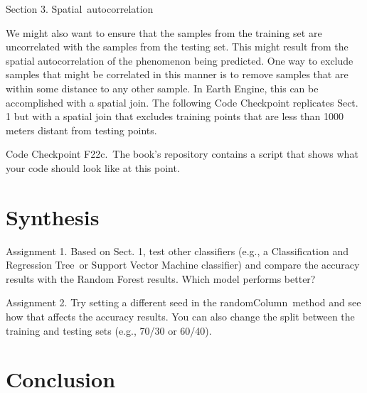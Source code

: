 \documentclass[
  letterpaper,
  DIV=11,
  numbers=noendperiod]{scrreprt}
\begin{document}
Section 3. Spatial~autocorrelation

We might also want to ensure that the samples from the training set are
uncorrelated with the samples from the testing set. This might result
from the spatial autocorrelation of the phenomenon being predicted. One
way to exclude samples that might be correlated in this manner is to
remove samples that are within some distance to any other sample. In
Earth Engine, this can be accomplished with a spatial join. The
following Code Checkpoint replicates Sect. 1 but with a spatial join
that excludes training points that are less than 1000 meters distant
from testing points.

\begin{tcolorbox}[enhanced jigsaw, left=2mm, breakable, rightrule=.15mm, opacityback=0, colframe=quarto-callout-note-color-frame, colbacktitle=quarto-callout-note-color!10!white, arc=.35mm, opacitybacktitle=0.6, toptitle=1mm, colback=white, leftrule=.75mm, title=\textcolor{quarto-callout-note-color}{\faInfo}\hspace{0.5em}{Note}, toprule=.15mm, bottomtitle=1mm, titlerule=0mm, bottomrule=.15mm, coltitle=black]

Code Checkpoint F22c.~The book's repository contains a script that shows
what your code should look like at this point.

\end{tcolorbox}

\hypertarget{synthesis-2}{%
\section*{Synthesis}\label{synthesis-2}}


Assignment 1. Based on Sect. 1, test other classifiers (e.g., a
Classification and Regression Tree~or Support Vector Machine classifier)
and compare the accuracy results with the Random Forest results. Which
model performs better?

Assignment 2. Try setting a different seed in the randomColumn~method
and see how that affects the accuracy results. You can also change the
split between the training and testing sets (e.g., 70/30 or 60/40).

\hypertarget{conclusion-6}{%
\section*{Conclusion}\label{conclusion-6}}
\end{document}
